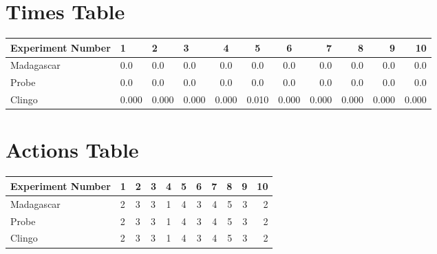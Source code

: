 \documentclass[8pt]{article}
\begin{document}
\begin{landscape}
\section{Times Table}\begin{tabular}{ | l | l | l | l | c | c | c | r | r | r | r | }\hline
Experiment Number & 1 & 2 & 3 & 4 & 5 & 6 & 7 & 8 & 9 & 10\\  \hline
Madagascar & 0.0 & 0.0 & 0.0 & 0.0 & 0.0 & 0.0 & 0.0 & 0.0 & 0.0 & 0.0\\  \hline
Probe & 0.0 & 0.0 & 0.0 & 0.0 & 0.0 & 0.0 & 0.0 & 0.0 & 0.0 & 0.0\\  \hline
Clingo & 0.000 & 0.000 & 0.000 & 0.000 & 0.010 & 0.000 & 0.000 & 0.000 & 0.000 & 0.000\\  \hline
\end{tabular}
\section{Actions Table}\begin{tabular}{ | l | l | l | l | c | c | c | r | r | r | r | }\hline
Experiment Number & 1 & 2 & 3 & 4 & 5 & 6 & 7 & 8 & 9 & 10\\ \hline
 Madagascar & 2 & 3 & 3 & 1 & 4 & 3 & 4 & 5 & 3 & 2\\ \hline
 Probe & 2 & 3 & 3 & 1 & 4 & 3 & 4 & 5 & 3 & 2\\ \hline
 Clingo & 2 & 3 & 3 & 1 & 4 & 3 & 4 & 5 & 3 & 2\\ \hline
\end{tabular}
\end{landscape}
\end{document}
